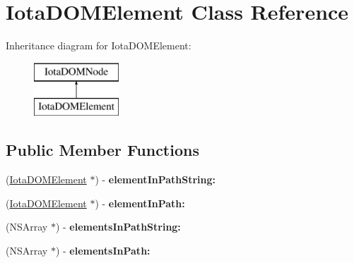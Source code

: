 \hypertarget{interface_iota_d_o_m_element}{
\section{IotaDOMElement Class Reference}
\label{interface_iota_d_o_m_element}
}
Inheritance diagram for IotaDOMElement:\begin{figure}[H]
\begin{center}
\leavevmode
\includegraphics[height=2.000000cm]{interface_iota_d_o_m_element}
\end{center}
\end{figure}
\subsection*{Public Member Functions}
\begin{DoxyCompactItemize}
\item 
\hypertarget{interface_iota_d_o_m_element_a0b7c96e04cea58377d051ebb41f6c05c}{
(\hyperlink{interface_iota_d_o_m_element}{IotaDOMElement} $\ast$) -\/ {\bfseries elementInPathString:}}
\label{interface_iota_d_o_m_element_a0b7c96e04cea58377d051ebb41f6c05c}

\item 
\hypertarget{interface_iota_d_o_m_element_a360342a10c47f1c12d33da07adee6a25}{
(\hyperlink{interface_iota_d_o_m_element}{IotaDOMElement} $\ast$) -\/ {\bfseries elementInPath:}}
\label{interface_iota_d_o_m_element_a360342a10c47f1c12d33da07adee6a25}

\item 
\hypertarget{interface_iota_d_o_m_element_a02106ef910a2f3f456007797ddef47fc}{
(NSArray $\ast$) -\/ {\bfseries elementsInPathString:}}
\label{interface_iota_d_o_m_element_a02106ef910a2f3f456007797ddef47fc}

\item 
\hypertarget{interface_iota_d_o_m_element_a8de53b6ca2324f4f1960aed0f64795fb}{
(NSArray $\ast$) -\/ {\bfseries elementsInPath:}}
\label{interface_iota_d_o_m_element_a8de53b6ca2324f4f1960aed0f64795fb}

\end{DoxyCompactItemize}

